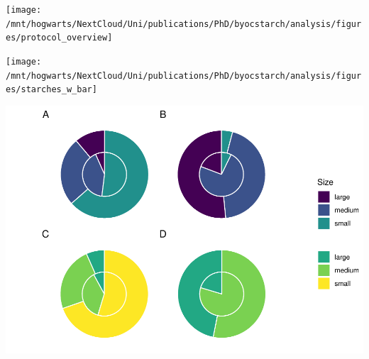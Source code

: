 \documentclass[utf8]{frontiers/frontiersSCNS}
\let\origfigure\figure
\let\endorigfigure\endfigure
\renewenvironment{figure}[1][2] {
    \expandafter\origfigure\expandafter[H]
} {
    \endorigfigure
}
\begin{document}
\begin{figure}[H]

{\centering \texttt{[image: /mnt/hogwarts/NextCloud/Uni/publications/PhD/byocstarch/analysis/figures/protocol\_overview]} 

}

\caption{Overview of experiment protocol including the plate setup.}\label{fig:protocol-fig}
\end{figure}

\begin{figure}[H]

{\centering \texttt{[image: /mnt/hogwarts/NextCloud/Uni/publications/PhD/byocstarch/analysis/figures/starches\_w\_bar]} 

}

\caption{Microscope image of a biofilm sample exposed to the potato starch solution. Potato granules can be seen within a bacterial community. Scale bar = 20 $\mu$m.}\label{fig:microscope-fig}
\end{figure}

\begin{figure}[H]

{\centering \includegraphics{../figures/ratio-plots-1} 

}

\caption{Proportion of sizes of starch granules from solutions (outer ring) and treatment samples (inner ring) in separated wheat (A) and potato (B) treatments, and mixed wheat (C) and potato (D) treatments.}\label{fig:ratio-plots}
\end{figure}
\end{document}
